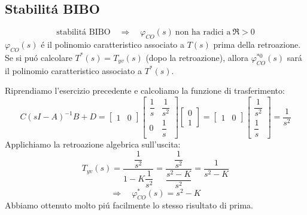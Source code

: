 \documentclass[../main.tex]{subfiles}
\begin{document}
	\subsection{Stabilit\'a BIBO}
		\[
			\text{stabilit\'a BIBO}\quad\Rightarrow\quad \varphi_{CO}(s)\ \text{non ha radici a}\ \Re > 0
		\]
		$ \varphi_{CO}(s) $ \'e il polinomio caratteristico associato a $ T(s) $ prima della retroazione. Se si pu\'o calcolare $ T^{*}(s) = T_{yv}(s) $ (dopo la retroazione), allora $ \varphi^{*0}_{CO}(s) $ sar\'a il polinomio caratteristico associato a $ T^{*}(s) $.
		\begin{Exercise}[title={Studiare retroazione algebrica uscita attraverso l'algebra dei blocchi}]
			Riprendiamo l'esercizio precedente e calcoliamo la funzione di trasferimento:
			\[
				C(sI-A)^{-1}B +D =
				\begin{bmatrix}
					1 & 0
				\end{bmatrix}
				\begin{bmatrix}
					\dfrac{1}{s} & \dfrac{1}{s^2}\\
					0 & \dfrac{1}{s}
				\end{bmatrix}
				\begin{bmatrix}
					0\\
					1
				\end{bmatrix} =
				\begin{bmatrix}
					1 & 0
				\end{bmatrix}
				\begin{bmatrix}
					\dfrac{1}{s^2}\\
					\dfrac{1}{s}
				\end{bmatrix} =
				\dfrac{1}{s^2}
			\]
			Applichiamo la retroazione algebrica sull'uscita:
			\[
				T_{yv}(s) = \dfrac{\dfrac{1}{s^2}}{1-K\dfrac{1}{s^2}} = \dfrac{\dfrac{1}{s^2}}{\dfrac{s^2-K}{s^2}} = \dfrac{1}{s^2 - K}
			\]
			\[
				\Rightarrow\quad \varphi^{*}_{CO}(s) = s^2 -K
			\]
			Abbiamo ottenuto molto pi\'u facilmente lo stesso risultato di prima.
		\end{Exercise}
	
\end{document}

